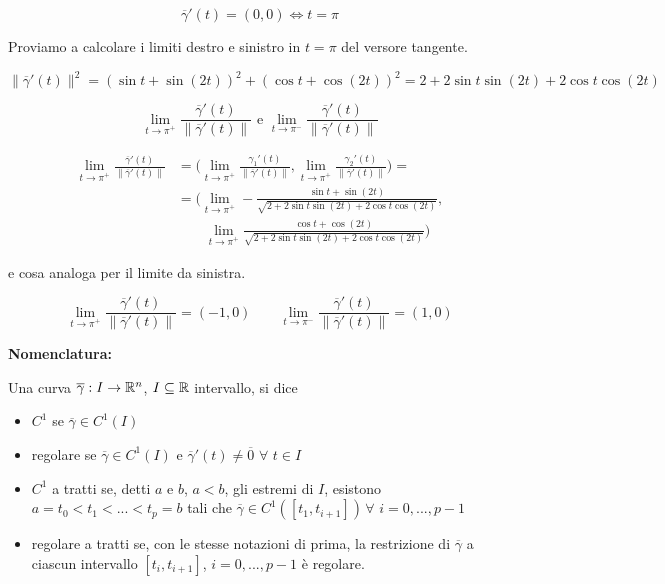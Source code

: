 \begin{exbar}
\begin{example}
	$$\overline{\gamma}'(t)=(0,0) \Leftrightarrow t=\pi$$
	
	Proviamo a calcolare i limiti destro e sinistro in $t=\pi$ del versore tangente.
	
	$$\|\overline{\gamma}'(t)\|^2=(\sin t + \sin (2t))^2+(\cos t +\cos (2t))^2=2+2\sin t \sin (2t)+2\cos t \cos (2t)$$
	
	$$\lim_{t \rightarrow \pi^+}\frac{\overline{\gamma}'(t)}{\|\overline{\gamma}'(t)\|} \text{ e } \lim_{t \rightarrow \pi^-}\frac{\overline{\gamma}'(t)}{\|\overline{\gamma}'(t)\|}$$
	
	\begin{align*} 
		\lim_{t \rightarrow \pi^+} \frac{\overline{\gamma}'(t)}{\|\overline{\gamma}'(t)\|}
		&=\bigg( \lim_{t\rightarrow \pi^+} \frac{\gamma_1'(t)}{\| \overline{\gamma}'(t)\|}, \lim_{t\rightarrow \pi^+} \frac{\gamma_2'(t)}{\| \overline{\gamma}'(t) \|} \bigg)=
		\\
		&=\bigg( \lim_{t \rightarrow \pi^+} -\frac{\sin t +\sin(2t)}{\sqrt{2+2\sin t \sin(2t)+2\cos t \cos(2t)}}, 
		\\
		& \qquad \lim_{t \rightarrow \pi^+} \frac{\cos t + \cos (2t)}{\sqrt{2+2\sin t \sin(2t)+2\cos t \cos(2t)}} \bigg)
	\end{align*}
	
	e cosa analoga per il limite da sinistra.
	
	$$\lim_{t \rightarrow \pi^+}\frac{\overline{\gamma}'(t)}{\|\overline{\gamma}'(t)\|}=(-1,0) \qquad \lim_{t \rightarrow \pi^-}\frac{\overline{\gamma}'(t)}{\|\overline{\gamma}'(t)\|}=(1,0)$$
\end{example}
\end{exbar}


\begin{attbar}
	\textbf{Nomenclatura:}
	
	Una curva $\overline{\gamma}: I \rightarrow \mathbb{R}^n$, $I \subseteq \mathbb{R}$ intervallo, si dice
	\begin{itemize}
		\item $C^1$ se $\overline{\gamma} \in C^1(I)$
		\item regolare se $\overline{\gamma} \in C^1(I)$ e $\overline{\gamma}'(t)\neq \overline{0} \,\, \forall \,\, t \in I$
		\item $C^1$ a tratti se, detti $a$ e $b$, $a < b$, gli estremi di $I$, esistono $a=t_0 <t_1<...<t_p=b$ tali che $\overline{\gamma} \in C^1([t_1,t_{i+1}]) \,\forall\,\, i =0,..., p-1$
		\item regolare a tratti se, con le stesse notazioni di prima, la restrizione di $\overline{\gamma}$ a ciascun intervallo  $[t_i,t_{i+1}]$, $i=0,...,p-1$ è regolare.
	\end{itemize}
\end{attbar}


